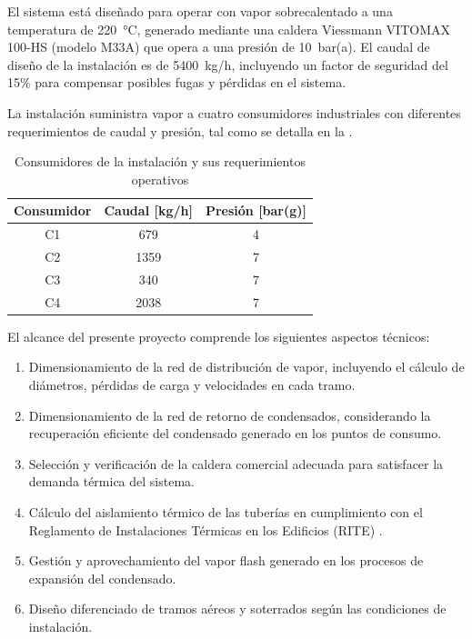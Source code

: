 \documentclass[12pt]{article}
\begin{document}
El sistema está diseñado para operar con vapor sobrecalentado a una temperatura de 220~°C, generado mediante una caldera Viessmann VITOMAX 100-HS (modelo M33A) que opera a una presión de 10~bar(a). El caudal de diseño de la instalación es de 5400~kg/h, incluyendo un factor de seguridad del 15\% para compensar posibles fugas y pérdidas en el sistema.

La instalación suministra vapor a cuatro consumidores industriales con diferentes requerimientos de caudal y presión, tal como se detalla en la .

\begin{table}[H]
	\centering
	\caption{Consumidores de la instalación y sus requerimientos operativos}
	\label{tab:consumidores-proyecto}
	\begin{tabular}{ccc}
		\toprule
		\textbf{Consumidor} & \textbf{Caudal [kg/h]} & \textbf{Presión [bar(g)]} \\
		\midrule
		C1                  & 679                    & 4                         \\
		C2                  & 1359                   & 7                         \\
		C3                  & 340                    & 7                         \\
		C4                  & 2038                   & 7                         \\
		\bottomrule
	\end{tabular}
\end{table}

El alcance del presente proyecto comprende los siguientes aspectos técnicos:

\begin{enumerate}[label=\arabic*., leftmargin=2em]
	\item Dimensionamiento de la red de distribución de vapor, incluyendo el cálculo de diámetros, pérdidas de carga y velocidades en cada tramo.
	\item Dimensionamiento de la red de retorno de condensados, considerando la recuperación eficiente del condensado generado en los puntos de consumo.
	\item Selección y verificación de la caldera comercial adecuada para satisfacer la demanda térmica del sistema.
	\item Cálculo del aislamiento térmico de las tuberías en cumplimiento con el Reglamento de Instalaciones Térmicas en los Edificios (RITE) \cite{RITE2007}.
	\item Gestión y aprovechamiento del vapor flash generado en los procesos de expansión del condensado.
	\item Diseño diferenciado de tramos aéreos y soterrados según las condiciones de instalación.
\end{enumerate}
\end{document}
